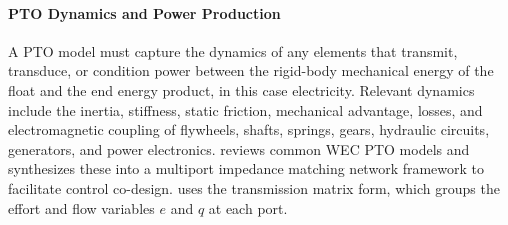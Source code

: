 \paragraph{PTO Dynamics and Power Production}
A PTO model must capture the dynamics of any elements that transmit, transduce, or condition power between the rigid-body mechanical energy of the float and the end energy product, in this case electricity.
Relevant dynamics include the inertia, stiffness, static friction, mechanical advantage, losses, and electromagnetic coupling of flywheels, shafts, springs, gears, hydraulic circuits, generators, and power electronics.
\cite{penalba_review_2016} reviews common WEC PTO models and \cite{coe_co-design_2024} synthesizes these into a multiport impedance matching network framework to facilitate control co-design.
\cite{coe_co-design_2024} uses the transmission matrix form, which groups the effort and flow variables $e$ and $q$ at each port. 

